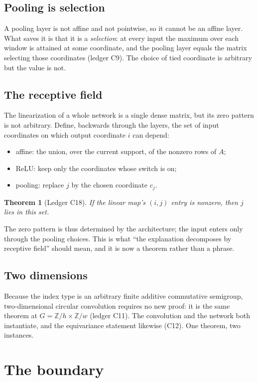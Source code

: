 \documentclass[11pt]{article}
\newtheorem{theorem}{Theorem}
\begin{document}
\subsection{Pooling is selection}

A pooling layer is not affine and not pointwise, so it cannot be an affine
layer. What saves it is that it is a \emph{selection}: at every input the
maximum over each window is attained at some coordinate, and the pooling layer
equals the matrix selecting those coordinates (ledger C9). The choice of tied
coordinate is arbitrary but the value is not.

\subsection{The receptive field}

The linearization of a whole network is a single dense matrix, but its zero
pattern is not arbitrary. Define, backwards through the layers, the set of
input coordinates on which output coordinate $i$ can depend:
\begin{itemize}
\item affine: the union, over the current support, of the nonzero rows of $A$;
\item ReLU: keep only the coordinates whose switch is on;
\item pooling: replace $j$ by the chosen coordinate $c_j$.
\end{itemize}
\begin{theorem}[Ledger C18]
If the linear map's $(i,j)$ entry is nonzero, then $j$ lies in this set.
\end{theorem}
The zero pattern is thus determined by the architecture; the input enters only
through the pooling choices. This is what ``the explanation decomposes by
receptive field'' should mean, and it is now a theorem rather than a phrase.

\subsection{Two dimensions}

Because the index type is an arbitrary finite additive commutative semigroup,
two-dimensional circular convolution requires no new proof: it is the same
theorem at $G = \mathbb{Z}/h \times \mathbb{Z}/w$ (ledger C11). The convolution
and the network both instantiate, and the equivariance statement likewise
(C12). One theorem, two instances.

\section{The boundary}
\end{document}
